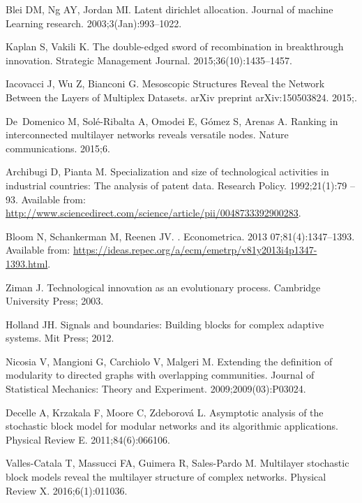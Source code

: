 \documentclass[12pt,twoside,a4paper]{article}
\begin{document}
\begin{thebibliography}{10}
Blei DM, Ng AY, Jordan MI.
\newblock Latent dirichlet allocation.
\newblock Journal of machine Learning research. 2003;3(Jan):993--1022.

Kaplan S, Vakili K.
\newblock The double-edged sword of recombination in breakthrough innovation.
\newblock Strategic Management Journal. 2015;36(10):1435--1457.

Iacovacci J, Wu Z, Bianconi G.
\newblock Mesoscopic Structures Reveal the Network Between the Layers of
  Multiplex Datasets.
\newblock arXiv preprint arXiv:150503824. 2015;.

De~Domenico M, Sol{\'e}-Ribalta A, Omodei E, G{\'o}mez S, Arenas A.
\newblock Ranking in interconnected multilayer networks reveals versatile
  nodes.
\newblock Nature communications. 2015;6.

Archibugi D, Pianta M.
\newblock Specialization and size of technological activities in industrial
  countries: The analysis of patent data.
\newblock Research Policy. 1992;21(1):79 -- 93.
\newblock Available from:
  \url{http://www.sciencedirect.com/science/article/pii/0048733392900283}.

Bloom N, Schankerman M, Reenen JV.
.
\newblock Econometrica. 2013 07;81(4):1347--1393.
\newblock Available from:
  \url{https://ideas.repec.org/a/ecm/emetrp/v81y2013i4p1347-1393.html}.

Ziman J.
\newblock Technological innovation as an evolutionary process.
\newblock Cambridge University Press; 2003.

Holland JH.
\newblock Signals and boundaries: Building blocks for complex adaptive systems.
\newblock Mit Press; 2012.

Nicosia V, Mangioni G, Carchiolo V, Malgeri M.
\newblock Extending the definition of modularity to directed graphs with
  overlapping communities.
\newblock Journal of Statistical Mechanics: Theory and Experiment.
  2009;2009(03):P03024.

Decelle A, Krzakala F, Moore C, Zdeborov{\'a} L.
\newblock Asymptotic analysis of the stochastic block model for modular
  networks and its algorithmic applications.
\newblock Physical Review E. 2011;84(6):066106.

Valles-Catala T, Massucci FA, Guimera R, Sales-Pardo M.
\newblock Multilayer stochastic block models reveal the multilayer structure of
  complex networks.
\newblock Physical Review X. 2016;6(1):011036.


\end{thebibliography}
\end{document}
